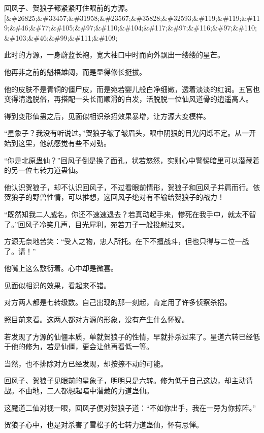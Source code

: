 
\begin{this_body}

回风子、贺狼子都紧紧盯住眼前的方源。[\&\#26825;\&\#33457;\&\#31958;\&\#23567;\&\#35828;\&\#32593;\&\#119;\&\#119;\&\#119;\&\#46;\&\#77;\&\#105;\&\#97;\&\#110;\&\#104;\&\#117;\&\#97;\&\#116;\&\#97;\&\#110;\&\#103;\&\#46;\&\#99;\&\#111;\&\#109;

此时的方源，一身蔚蓝长袍，宽大袖口中时而向外飘出一缕缕的星芒。

他再非之前的魁梧雄阔，而是显得修长挺拔。

他的皮肤不是青铜的僵尸皮，而是宛若婴儿般白净细嫩，透着淡淡的红润。五官也变得清逸脱俗，再搭配一头长而顺滑的白发，活脱脱一位仙风道骨的逍遥高人。

得到变形仙蛊之后，见面似相识杀招效果暴增，让方源大变模样。

“星象子？我没有听说过。”贺狼子皱了皱眉头，眼中阴狠的目光闪烁不定。从一开始到这里，他就感觉有些不对劲。

“你是北原蛊仙？”回风子倒是换了面孔，状若悠然，实则心中警惕暗里可以潜藏着的另一位七转力道蛊仙。

他认识贺狼子，却不认识回风子，不过看眼前情形，贺狼子和回风子并肩而行。依贺狼子的野兽性情，可以推想，这回风子绝对有不输给贺狼子的战力！

“既然知我二人威名，你还不速速退去？若真动起手来，惨死在我手中，就太不智了。”回风子冷笑几声，目光犀利，宛若刀子一般投射过来。

方源无奈地苦笑：“受人之物，忠人所托。在下不擅战斗，但也只得与二位一战了。请！”

他嘴上这么敷衍着。心中却是微喜。

见面似相识的效果，看起来不错。

对方两人都是七转级数。自己出现的那一刻起，肯定用了许多侦察杀招。

照目前来看。这两人都对方源的形象，没有产生什么怀疑。

若发现了方源的仙僵本质，单就贺狼子的性情，早就扑杀过来了。星道六转已经低于他的修为，若是仙僵，更会让他再看低一等。

当然，也不排除对方已经发现，却按捺不动的可能。

回风子、贺狼子见眼前的星象子，明明只是六转。修为低于自己这边，却主动请战。不由地，二人都想起暗中潜藏的力道蛊仙。

这魔道二仙对视一眼，回风子便对贺狼子道：“不如你出手，我在一旁为你掠阵。”

贺狼子心中，也是对杀害了雪松子的七转力道蛊仙，怀有忌惮。


\end{this_body}
